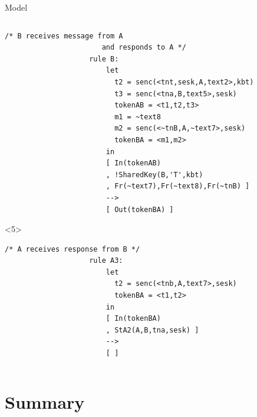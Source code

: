 \documentclass[11pt,aspectratio=169]{beamer}
\begin{document}
\begin{frame}[fragile]{Model}
\begin{columns}
\begin{column}{0.6\textwidth}
\begin{onlyenv}
\begin{lstlisting}[style=tamarin, gobble=20]
                    /* B receives message from A
                       and responds to A */
                    rule B:
                        let
                          t2 = senc(<tnt,sesk,A,text2>,kbt)
                          t3 = senc(<tna,B,text5>,sesk)
                          tokenAB = <t1,t2,t3>
                          m1 = ~text8
                          m2 = senc(<~tnB,A,~text7>,sesk)
                          tokenBA = <m1,m2>
                        in
                        [ In(tokenAB)
                        , !SharedKey(B,'T',kbt)
                        , Fr(~text7),Fr(~text8),Fr(~tnB) ]
                        -->
                        [ Out(tokenBA) ]
                \end{lstlisting}
            \end{onlyenv}
            \begin{onlyenv}<5>
                \begin{lstlisting}[style=tamarin, gobble=20]
                    /* A receives response from B */
                    rule A3:
                        let
                          t2 = senc(<tnb,A,text7>,sesk)
                          tokenBA = <t1,t2>
                        in
                        [ In(tokenBA)
                        , StA2(A,B,tna,sesk) ]
                        -->
                        [ ]
                \end{lstlisting}
            \end{onlyenv}
        \end{column}
    \end{columns}
\end{frame}


\section*{Summary}

\end{document}

